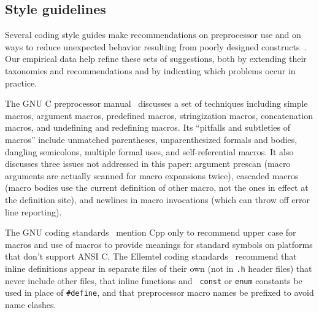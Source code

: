 \documentclass[10pt]{article}
\newcommand{\file}[1]{\texttt{#1}}
\begin{document}
\subsection{Style guidelines}

Several coding style guides make recommendations on preprocessor use and on
ways to reduce unexpected behavior resulting from poorly designed
constructs~\cite{Cannon90}.  Our empirical data help refine these sets of
suggestions, both by extending their taxonomies and recommendations and by
indicating which problems occur in practice.

The GNU C preprocessor manual~\cite{cpp-manual} discusses
a set of techniques including simple macros, argument macros, predefined
macros, stringization macros, concatenation macros, and undefining and
redefining macros.  Its ``pitfalls and subtleties of macros'' include
unmatched parentheses, unparenthesized formals and bodies, dangling
semicolons, multiple formal uses, and self-referential macros.  It also
discusses three issues not addressed in this paper:  argument prescan
(macro arguments are actually scanned for macro expansions twice), cascaded
macros (macro bodies use the current definition of other macro, not the
ones in effect at the definition site), and newlines in macro invocations
(which can throw off error line reporting).

The GNU coding standards~\cite{Stallman97} mention Cpp only to recommend
upper case for macros and use of macros to provide meanings for standard
symbols on platforms that don't support ANSI C\@.
The Ellemtel coding standards~\cite{ellemtel92} recommend that inline
definitions appear in separate files of their own (not in \file{.h} header
files) that never include other files, that inline functions and {\tt
const} or {\tt enum} constants be used in place of {\tt \#define}, and that
preprocessor macro names be prefixed to avoid name clashes.
\end{document}
